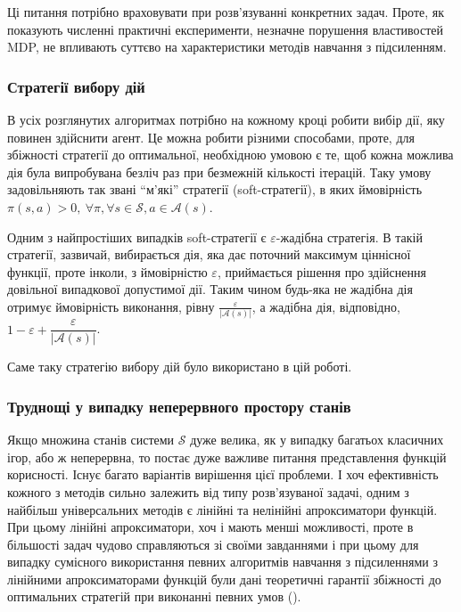 \documentclass[a4paper,10pt,fleqn]{article}
\begin{document}
Ці питання потрібно враховувати при розв'язуванні конкретних задач. Проте, як показують численні практичні експерименти, незначне порушення властивостей MDP, не впливають суттєво на характеристики методів навчання з підсиленням.

\subsubsection{Стратегії вибору дій}
В усіх розглянутих алгоритмах потрібно на кожному кроці робити вибір дії, яку повинен здійснити агент. Це можна робити різними способами, проте, для збіжності стратегії до оптимальної, необхідною умовою є те, щоб кожна можлива дія була випробувана безліч раз при безмежній кількості ітерацій. Таку умову задовільняють так звані ``м'які'' стратегії (soft-стратегії), в яких ймовірність $\pi(s,a)>0,\ \forall \pi, \forall s \in \mathcal{S}, a \in \mathcal{A}(s)$.

Одним з найпростіших випадків soft-стратегії є $\varepsilon$-жадібна стратегія. В такій стратегії, зазвичай, вибирається дія, яка дає поточний максимум ціннісної функції, проте інколи, з ймовірністю $\varepsilon$, приймається рішення про здійснення довільної випадкової допустимої дії. Таким чином будь-яка не жадібна дія отримує ймовірність виконання, рівну $\frac{\varepsilon}{|\mathcal{A}(s)|}$, а жадібна дія, відповідно, $ 1 - \varepsilon + \dfrac{\varepsilon}{|\mathcal{A}(s)|}$.

Саме таку стратегію вибору дій було використано в цій роботі.

\subsubsection{Труднощі у випадку неперервного простору станів}

Якщо множина станів системи $\mathcal{S}$ дуже велика, як у випадку багатьох класичних ігор, або ж неперервна, то постає дуже важливе питання представлення функцій корисності. Існує багато варіантів вирішення цієї проблеми. І хоч ефективність кожного з методів сильно залежить від типу розв'язуваної задачі, одним з найбільш універсальних методів є лінійні та нелінійні апроксиматори функцій. При цьому лінійні апроксиматори, хоч і мають менші можливості, проте в більшості задач чудово справляються зі своїми завданнями і при цьому для випадку сумісного використання певних алгоритмів навчання з підсиленнями з лінійними апроксиматорами функцій були дані теоретичні гарантії збіжності до оптимальних стратегій при виконанні певних умов (\cite{Coulom2002}).
\end{document}
